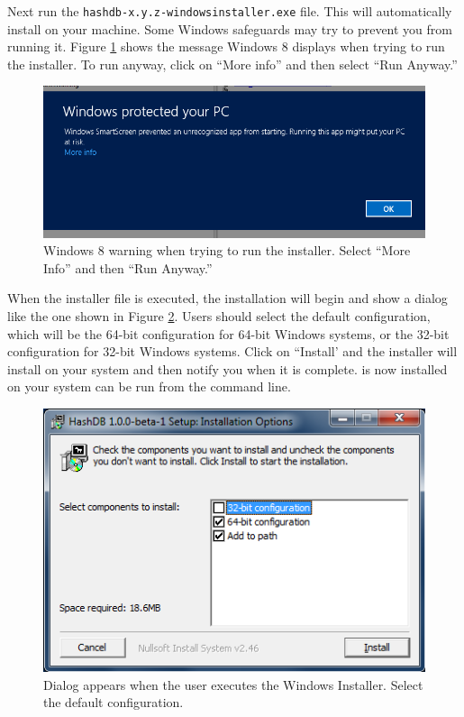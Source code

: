 \documentclass[11pt,fleqn]{article} %
\begin{document}
 Next run the \texttt{hashdb-x.y.z-windowsinstaller.exe} file. This will automatically install \hash on your machine. Some Windows safeguards may try to prevent you from running it. Figure \ref{fig:windowsWarning} shows the message Windows 8 displays when trying to run the installer. To run anyway, click on ``More info'' and then select ``Run Anyway.'' \\
\begin{figure}
	\center
	\includegraphics[scale=.5]{windowsWarning.png}
	\caption{Windows 8 warning when trying to run the installer. Select ``More Info'' and then ``Run Anyway.''}
	\label{fig:windowsWarning}
\end{figure}

When the installer file is executed, the installation will begin and show a dialog like the one shown in Figure \ref{fig:windowsInstaller}.  Users should select the default configuration, which will be the 64-bit configuration for 64-bit Windows systems, or the 32-bit configuration for 32-bit Windows systems. Click on ``Install' and the installer will install \hash on your system and then notify you when it is complete. \hash is now installed on your system can be run from the command line.\\

\begin{figure}
	\center
	\includegraphics[scale=.8]{WindowsInstaller.png}
	\caption{Dialog appears when the user executes the Windows Installer. Select the default configuration.}
	\label{fig:windowsInstaller}
\end{figure}
\end{document}
